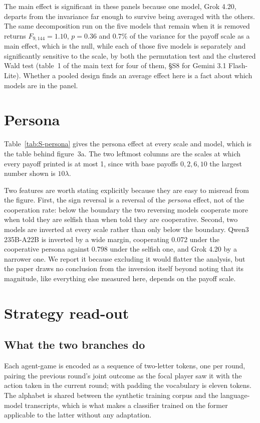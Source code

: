 \documentclass[11pt,a4paper]{article}
\newcommand{\lam}{\lambda}
\begin{document}
The main effect is significant in these panels because one model, Grok 4.20,
departs from the invariance far enough to survive being averaged with the
others. The same decomposition run on the five models that remain when it is
removed returns $F_{9,144} = 1.10$, $p = 0.36$ and $0.7\%$ of the variance for
the payoff scale as a main effect, which is the null, while each of those five
models is separately and significantly sensitive to the scale, by both the
permutation test and the clustered Wald test (table~1 of the main text for four
of them, \S S8 for Gemini 3.1 Flash-Lite). Whether a pooled design finds an
average effect here is a fact about which models are in the panel.

\section{Persona}

Table~\ref{tab:S-persona} gives the persona effect at every scale and model,
which is the table behind figure~3a. The two leftmost columns are the scales at
which every payoff printed is at most 1, since with base payoffs $0, 2, 6, 10$
the largest number shown is $10\lam$.

Two features are worth stating explicitly because they are easy to misread from
the figure. First, the sign reversal is a reversal of the \emph{persona} effect,
not of the cooperation rate: below the boundary the two reversing models
cooperate more when told they are selfish than when told they are cooperative.
Second, two models are inverted at every scale rather than only below the
boundary. Qwen3 235B-A22B is inverted by a wide margin, cooperating 0.072 under
the cooperative persona against 0.798 under the selfish one, and Grok 4.20 by a
narrower one. We report it because excluding it would flatter the analysis,
but the paper draws no conclusion from the inversion itself beyond noting that
its magnitude, like everything else measured here, depends on the payoff scale.

\section{Strategy read-out}

\subsection{What the two branches do}

Each agent-game is encoded as a sequence of two-letter tokens, one per round,
pairing the previous round's joint outcome as the focal player saw it with the
action taken in the current round; with padding the vocabulary is eleven tokens.
The alphabet is shared between the synthetic training corpus and the
language-model transcripts, which is what makes a classifier trained on the
former applicable to the latter without any adaptation.
\end{document}
